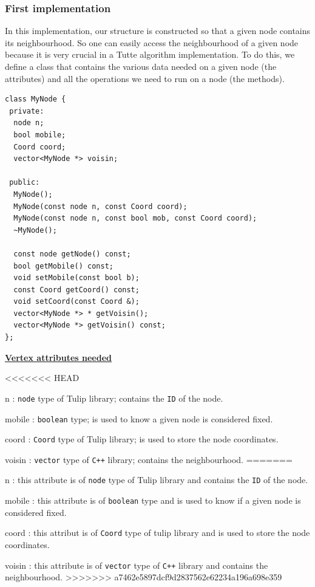 \subsubsection{First implementation}
In this implementation, our structure is constructed so that a given node
contains its neighbourhood. So one can easily access the neighbourhood
of a given node because it is very crucial in a Tutte algorithm
implementation. To do this, we define a class that contains the various
data needed on a given node (the attributes) and all the operations we
need to run on a node (the methods).

\newpage
\begin{lstlisting}
class MyNode {
 private:
  node n;
  bool mobile;
  Coord coord;  
  vector<MyNode *> voisin;

 public:
  MyNode();
  MyNode(const node n, const Coord coord);
  MyNode(const node n, const bool mob, const Coord coord);
  ~MyNode();
  
  const node getNode() const;
  bool getMobile() const;
  void setMobile(const bool b);
  const Coord getCoord() const;
  void setCoord(const Coord &);
  vector<MyNode *> * getVoisin();
  vector<MyNode *> getVoisin() const;
};
\end{lstlisting}
\noindent
\underline{\bf Vertex attributes needed}
\begin{dinglist}{70}
<<<<<<< HEAD
\item[n]: \texttt{node} type of \textsf{Tulip} library; contains the \texttt{ID} of the node.  
\item[mobile]: \texttt{boolean} type; is used to know a given node is considered fixed.
\item[coord]: \texttt{Coord} type of \textsf{Tulip} library; is used to store the node coordinates. 
\item[voisin]: \texttt{vector} type of \texttt{C++} library; contains the neighbourhood.
=======
\item[n]: this attribute is of \texttt{node} type of \textsf{Tulip} library and contains the \texttt{ID} of the node.  
\item[mobile]: this attribute is of \texttt{boolean} type and is used to know if a given node is considered fixed.
\item[coord]: this attribut is of \texttt{Coord} type of \textsf{tulip} library and is used to store the node coordinates. 
\item[voisin]: this attribute is of \texttt{vector} type of \texttt{C++} library and contains the neighbourhood.
>>>>>>> a7462e5897dcf9d2837562e62234a196a698e359
\end{dinglist}

